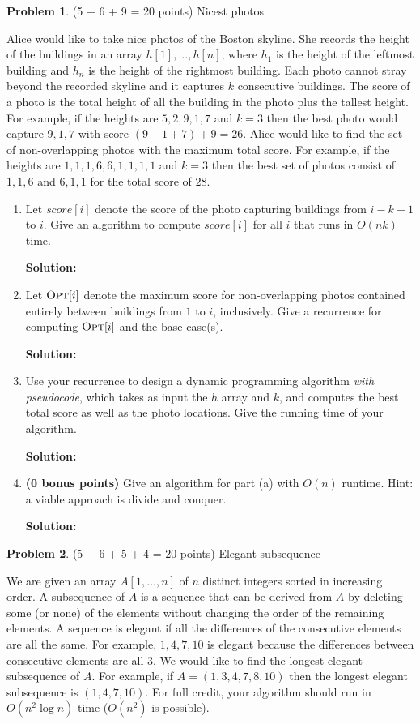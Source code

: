 \documentclass[11pt]{article}
\theoremstyle{definition}
\theoremstyle{theorem}
\newtheorem{prob}{Problem}
\newcommand{\opt}{\mbox{{\sc Opt}}}
\newcommand{\solution}[1]{{\medskip\noindent\color{DarkBlue}\textbf{Solution:} {#1}}}
\newcommand{\solution}[1]{}
\begin{document}
\newpage

\begin{prob}
	(5 + 6 + 9 = 20 points) Nicest photos
\end{prob}

Alice would like to take nice photos of the Boston skyline. She records the height of the buildings in an array $h[1],\ldots, h[n]$, where $h_1$ is the height of the leftmost building and $h_n$ is the height of the rightmost building. Each photo cannot stray beyond the recorded skyline and it captures $k$ consecutive buildings. The score of a photo is the total height of all the building in the photo plus the tallest height. For example, if the heights are $5,2,9,1,7$ and $k=3$ then the best photo would capture $9,1,7$ with score $(9+1+7)+9 = 26$. Alice would like to find the set of non-overlapping photos with the maximum total score. For example, if the heights are $1,1,1,6,6,1,1,1,1$ and $k=3$ then the best set of photos consist of $1,1,6$ and $6,1,1$ for the total score of $28$.

\begin{enumerate}[label={\bf (\alph*)}]
	\item Let $score[i]$ denote the score of the photo capturing buildings from $i-k+1$ to $i$. Give an algorithm to compute $score[i]$ for all $i$ that runs in $O(nk)$ time.
	
	\solution{
	}
	\item Let $\opt[i]$ denote the maximum score for non-overlapping photos contained entirely between buildings from $1$ to $i$, inclusively. Give a recurrence for computing $\opt[i]$ and the base case(s).
	
	\solution{
	}

	\item Use your recurrence to design a dynamic programming algorithm {\em with pseudocode}, which takes as input the $h$ array and $k$, and computes the best total score as well as the photo locations. Give the running time of your algorithm.
	
	\solution{
	}

	
	\item {\bf (0 bonus points)} Give an algorithm for part (a) with $O(n)$ runtime. Hint: a viable approach is divide and conquer.

	\solution{
	}
\end{enumerate}
\newpage

\begin{prob}{(5 + 6 + 5 + 4 = 20 points) Elegant subsequence}\end{prob}
We are given an array $A[1,\ldots, n]$ of $n$ distinct integers sorted in increasing order. A subsequence of $A$ is a sequence that can be derived from $A$ by deleting some (or none) of the elements without changing the order of the remaining elements. A sequence is elegant if all the differences of the consecutive elements are all the same. For example, $1,4,7,10$ is elegant because the differences between consecutive elements are all $3$. We would like to find the longest elegant subsequence of $A$. For example, if $A = (1,3,4,7,8,10)$ then the longest elegant subsequence is $(1,4,7,10)$. For full credit, your algorithm should run in $O(n^2 \log n)$ time ($O(n^2)$ is possible).
\end{document}
